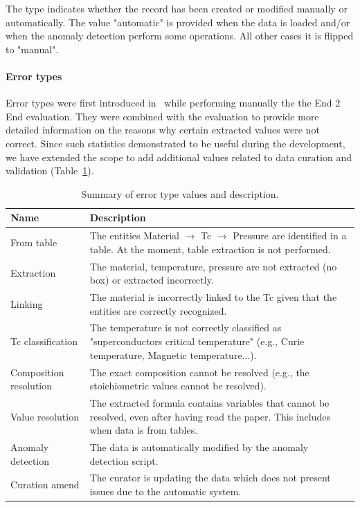 \documentclass{article}
\begin{document}
The type indicates whether the record has been created or modified manually or automatically. The value "automatic" is provided when the data is loaded and/or when the anomaly detection perform some operations. All other cases it is flipped to "manual". 

\paragraph{Error types} Error types were first introduced in~\cite{lfoppiano2023automatic} while performing manually the the End 2 End evaluation. They were combined with the evaluation to provide more detailed information on the reasons why certain extracted values were not correct. 
Since such statistics demonstrated to be useful during the development, we have extended the scope to add additional values related to data curation and validation (Table~\ref{tab:error-types}).

\begin{table}[htbp]
\centering
\begin{tabular}{|p{4cm}|p{8cm}|}
\hline
\textbf{Name} & \textbf{Description} \\
\hline
From table & The entities Material $\rightarrow$ Tc $\rightarrow$ Pressure are identified in a table. At the moment, table extraction is not performed. \\
\hline
Extraction & The material, temperature, pressure are not extracted (no box) or extracted incorrectly. \\
\hline
Linking & The material is incorrectly linked to the Tc given that the entities are correctly recognized. \\
\hline
Tc classification & The temperature is not correctly classified as "superconductors critical temperature" (e.g., Curie temperature, Magnetic temperature...). \\
\hline
Composition resolution & The exact composition cannot be resolved (e.g., the stoichiometric values cannot be resolved). \\
\hline
Value resolution & The extracted formula contains variables that cannot be resolved, even after having read the paper. This includes when data is from tables. \\
\hline
Anomaly detection & The data is automatically modified by the anomaly detection script. \\
\hline
Curation amend & The curator is updating the data which does not present issues due to the automatic system. \\
\hline
\end{tabular}
\caption{Summary of error type values and description.}
\label{tab:error-types}
\end{table}
\end{document}
